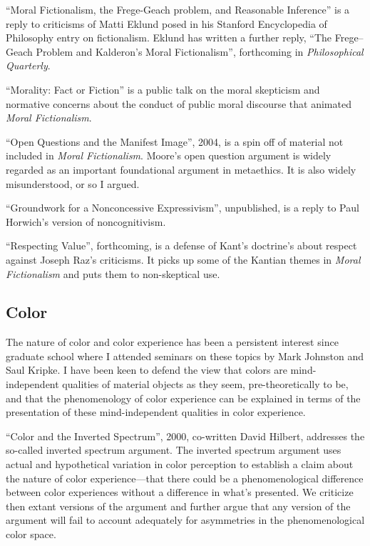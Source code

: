 \documentclass[contbibnum]{cv}
\begin{document}
``Moral Fictionalism, the Frege-Geach problem, and Reasonable Inference'' is a reply to criticisms of Matti Eklund posed in his Stanford Encyclopedia of Philosophy entry on fictionalism. Eklund has written a further reply, ``The Frege--Geach Problem and Kalderon's Moral Fictionalism'', forthcoming in \emph{Philosophical Quarterly}.

``Morality: Fact or Fiction'' is a public talk on the moral skepticism and normative concerns about the conduct of public moral discourse that animated \emph{Moral Fictionalism}.

``Open Questions and the Manifest Image'', 2004, is a spin off of material not included in \emph{Moral Fictionalism}. Moore's open question argument is widely regarded as an important foundational argument in metaethics. It is also widely misunderstood, or so I argued.

``Groundwork for a Nonconcessive Expressivism'', unpublished, is a reply to Paul Horwich's version of noncognitivism. 

``Respecting Value'', forthcoming, is a defense of Kant's doctrine's about respect against Joseph Raz's criticisms. It picks up some of the Kantian themes in \emph{Moral Fictionalism} and puts them to non-skeptical use.




\subsection{Color}\label{sub:color} %

The nature of color and color experience has been a persistent interest since graduate school where I attended seminars on these topics by Mark Johnston and Saul Kripke. I have been keen to defend the view that colors are mind-independent qualities of material objects as they seem, pre-theoretically to be, and that the phenomenology of color experience can be explained in terms of the presentation of these mind-independent qualities in color experience. 

``Color and the Inverted Spectrum'', 2000, co-written David Hilbert, addresses the so-called inverted spectrum argument. The inverted spectrum argument uses actual and hypothetical variation in color perception to establish a claim about the nature of color experience---that there could be a phenomenological difference between color experiences without a difference in what's presented. We criticize then extant versions of the argument and further argue that any version of the argument will fail to account adequately for asymmetries in the phenomenological color space.
\end{document}

